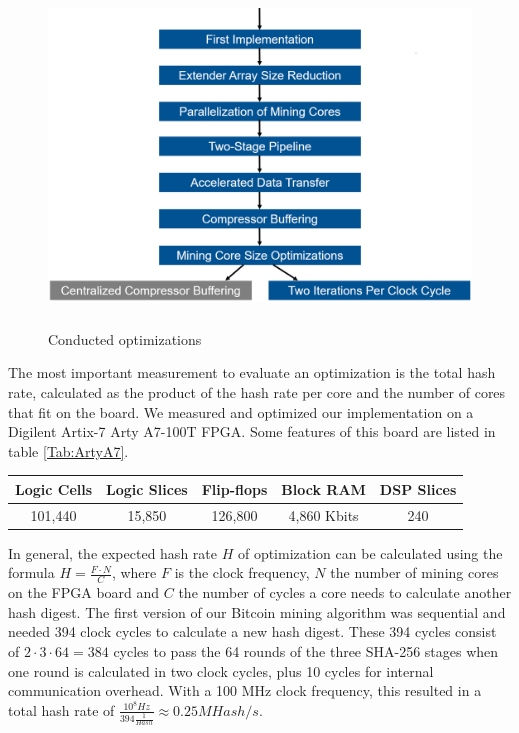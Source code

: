 \begin{figure}
	\centering
	\includegraphics[height=9cm]{img/optimization_dep.png}
	\caption[Conducted optimizations]{Conducted optimizations}
	\label{fig:optimization-dep}
\end{figure}

The most important measurement to evaluate an optimization is the total hash rate, calculated as the product of the hash rate per core and the number of cores that fit on the board. We measured and optimized our implementation on a Digilent Artix-7 Arty A7-100T FPGA. Some features of this board are listed in table \ref{Tab:ArtyA7}.

\begin{table}[ht]
\centering
\begin{tabular}[t]{ccccc}
\hline
\textbf{Logic Cells}&\textbf{Logic Slices}&\textbf{Flip-flops}&\textbf{Block RAM}&\textbf{DSP Slices}\\
\hline
101,440&15,850&126,800&4,860 Kbits&240\\
\hline
\end{tabular}
\end{table}%


In general, the expected hash rate $H$ of optimization can be calculated using the formula $H = \frac{F \cdot N}{C}$, where $F$ is the clock frequency, $N$ the number of mining cores on the FPGA board and $C$ the number of cycles a core needs to calculate another hash digest. The first version of our Bitcoin mining algorithm was sequential and needed 394 clock cycles to calculate a new hash digest. These 394 cycles consist of $2 \cdot 3 \cdot 64 = 384$ cycles to pass the 64 rounds of the three SHA-256 stages when one round is calculated in two clock cycles, plus 10 cycles for internal communication overhead. With a 100 MHz clock frequency, this resulted in a total hash rate of $\frac{10^8 Hz}{394 \frac{1}{Hash}} \approx 0.25 MHash/s$.

